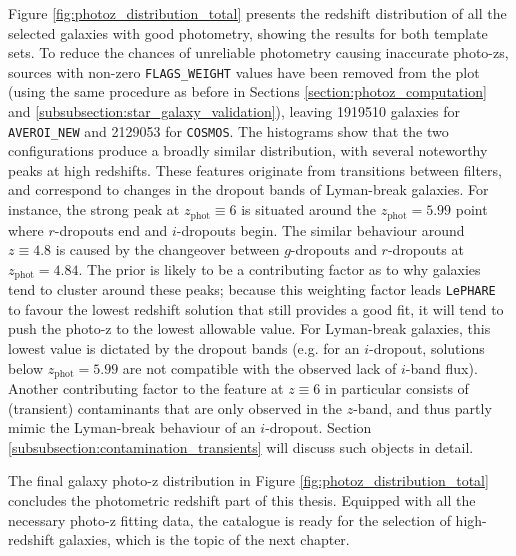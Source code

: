 Figure \ref{fig:photoz_distribution_total} presents the redshift distribution of all the selected galaxies with good photometry, showing the results for both template sets. To reduce the chances of unreliable photometry causing inaccurate photo-zs, sources with non-zero \texttt{FLAGS\_WEIGHT} values have been removed from the plot (using the same procedure as before in Sections \ref{section:photoz_computation} and \ref{subsubsection:star_galaxy_validation}), leaving \num{1919510} galaxies for \texttt{AVEROI\_NEW} and \num{2129053} for \texttt{COSMOS}. The histograms show that the two configurations produce a broadly similar distribution, with several noteworthy peaks at high redshifts. These features originate from transitions between filters, and correspond to changes in the dropout bands of Lyman-break galaxies. For instance, the strong peak at $z_{\mathrm{phot}}\equiv6$ is situated around the $z_{\mathrm{phot}}=5.99$ point where $r$-dropouts end and $i$-dropouts begin. The similar behaviour around $z\equiv4.8$ is caused by the changeover between $g$-dropouts and $r$-dropouts at $z_{\mathrm{phot}}=4.84$. The prior is likely to be a contributing factor as to why galaxies tend to cluster around these peaks; because this weighting factor leads \texttt{LePHARE} to favour the lowest redshift solution that still provides a good fit, it will tend to push the photo-z to the lowest allowable value. For Lyman-break galaxies, this lowest value is dictated by the dropout bands (e.g. for an $i$-dropout, solutions below $z_{\mathrm{phot}}=5.99$ are not compatible with the observed lack of $i$-band flux). Another contributing factor to the feature at $z\equiv6$ in particular consists of (transient) contaminants that are only observed in the $z$-band, and thus partly mimic the Lyman-break behaviour of an $i$-dropout. Section \ref{subsubsection:contamination_transients} will discuss such objects in detail. \par


The final galaxy photo-z distribution in Figure \ref{fig:photoz_distribution_total} concludes the photometric redshift part of this thesis. Equipped with all the necessary photo-z fitting data, the \DESVIDEO catalogue is ready for the selection of high-redshift galaxies, which is the topic of the next chapter.\par


